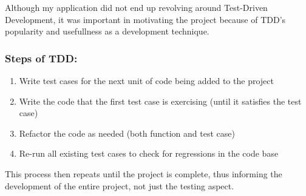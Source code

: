 \documentclass[10pt,twocolumn]{article}
\begin{document}

Although my application did not end up revolving around Test-Driven Development, it was 
important in motivating the project because of TDD's popularity and usefullness as a development technique. 

\subsubsection*{Steps of TDD:}
\begin{enumerate}
    \item Write test cases for the next unit of code being added to the project
    \item Write the code that the first test case is exercising (until it satisfies the test case)
    \item Refactor the code as needed (both function and test case)
    \item Re-run all existing test cases to check for regressions in the code base \cite{Bhat2006Article}
\end{enumerate}

This process then repeats until the project is complete, thus informing the 
development of the entire project, not just the testing aspect. 

 

\end{document}
